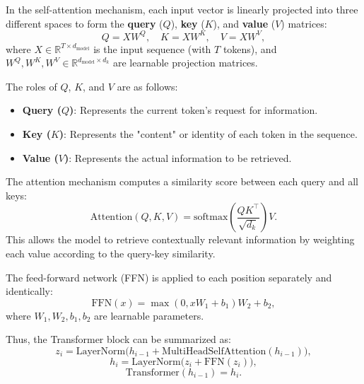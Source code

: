\documentclass[conference]{IEEEtran}
\begin{document}
In the self-attention mechanism, each input vector is linearly projected into three different spaces to form the \textbf{query} ($Q$), \textbf{key} ($K$), and \textbf{value} ($V$) matrices:
\begin{equation}\label{eq:at}
Q = XW^Q, \quad K = XW^K, \quad V = XW^V,
\end{equation}
where $X \in \mathbb{R}^{T \times d_{\text{model}}}$ is the input sequence (with $T$ tokens), and $W^Q, W^K, W^V \in \mathbb{R}^{d_{\text{model}} \times d_k}$ are learnable projection matrices.

The roles of $Q$, $K$, and $V$ are as follows:
\begin{itemize}
  \item \textbf{Query ($Q$)}: Represents the current token's request for information.
  \item \textbf{Key ($K$)}: Represents the "content" or identity of each token in the sequence.
  \item \textbf{Value ($V$)}: Represents the actual information to be retrieved.
\end{itemize}

The attention mechanism computes a similarity score between each query and all keys:
\begin{equation}
\text{Attention}(Q, K, V) = \text{softmax}\left( \frac{QK^\top}{\sqrt{d_k}} \right) V.
\end{equation}
This allows the model to retrieve contextually relevant information by weighting each value according to the query-key similarity.


The feed-forward network (FFN) is applied to each position separately and identically:
\begin{equation}
\text{FFN}(x) = \max(0, xW_1 + b_1)W_2 + b_2,
\end{equation}
where $W_1, W_2, b_1, b_2$ are learnable parameters.

Thus, the Transformer block can be summarized as:
\begin{equation}
z_i = \mathrm{LayerNorm}\big(h_{i-1} + \mathrm{MultiHeadSelfAttention}(h_{i-1})\big), 
\end{equation}
\begin{equation}
h_i = \mathrm{LayerNorm}\big(z_i + \mathrm{FFN}(z_i)\big), 
\end{equation}
\begin{equation}
\text{Transformer}(h_{i-1}) = h_i.
\end{equation}
\end{document}
